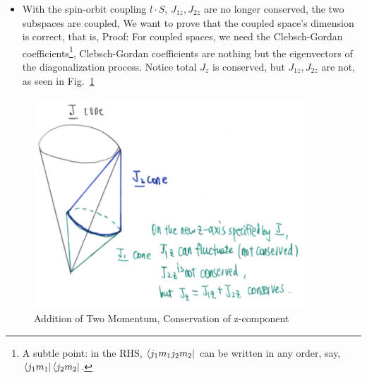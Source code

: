 \documentclass{school-22.101-notes}
\begin{document}
\begin{enumerate}
\begin{itemize}
  \item With the spin-orbit coupling $l \cdot S$, $J_{1z}, J_{2z}$ are no longer conserved, the two subspaces are coupled, 
    We want to prove that the coupled space's dimension is correct, that is, 
    Proof:
    For coupled spaces, we need the Clebsch-Gordan coefficients\footnote{A subtle point: in the RHS, $\left< j_1 m_1 j_2 m_2 \right|$ can be written in any order, say, $\left< j_1 m_1 \right| \left< j_2 m_2 \right|$.}, 
    Clebsch-Gordan coefficients are nothing but the eigenvectors of the diagonalization process. Notice total $J_z$ is conserved, but $J_{1z}, J_{2z}$ are not, as seen in Fig.~\ref{addition-of-momentum}
  \end{itemize}
\end{enumerate}
\begin{figure}[ht]
  \centering
  \includegraphics[width=4in]{images/qm/addition-of-momentum.png}
  \caption{Addition of Two Momentum, Conservation of z-component} \label{addition-of-momentum} 
\end{figure}
\end{document}
